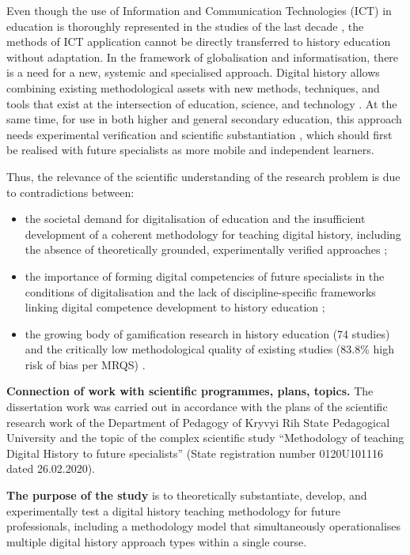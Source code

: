 {Even though the use of Information and Communication Technologies (ICT) in education is thoroughly represented in the studies of the last decade \cite{DichevDicheva2017, KoivistoHamari2019}, the methods of ICT application cannot be directly transferred to history education without adaptation. In the framework of globalisation and informatisation, there is a need for a new, systemic and specialised approach. Digital history allows combining existing methodological assets with new methods, techniques, and tools that exist at the intersection of education, science, and technology \cite{CohenRosenzweig2006, Wright-Maley2018}. At the same time, for use in both higher and general secondary education, this approach needs experimental verification and scientific substantiation \cite{Hattie2009, Tamim2011}, which should first be realised with future specialists as more mobile and independent learners.

Thus, the relevance of the scientific understanding of the research problem is due to contradictions between:
\begin{itemize}
\item the societal demand for digitalisation of education and the insufficient development of a coherent methodology for teaching digital history, including the absence of theoretically grounded, experimentally verified approaches \cite{UNESCO2023, Block2021, Hamari2014, DichevDicheva2017};
\item the importance of forming digital competencies of future specialists in the conditions of digitalisation and the lack of discipline-specific frameworks linking digital competence development to history education \cite{Vuorikari2016, Titova2025cte};
\item the growing body of gamification research in history education (74 studies) and the critically low methodological quality of existing studies (83.8\% high risk of bias per MRQS) \citep{Korniienko2025mrqs}.
\end{itemize}

\textbf{Connection of work with scientific programmes, plans, topics.} The dissertation work was carried out in accordance with the plans of the scientific research work of the Department of Pedagogy of Kryvyi Rih State Pedagogical University and the topic of the complex scientific study ``Methodology of teaching Digital History to future specialists'' (State registration number 0120U101116 dated 26.02.2020).

\textbf{The purpose of the study} is to theoretically substantiate, develop, and experimentally test a digital history teaching methodology for future professionals, including a methodology model that simultaneously operationalises multiple digital history approach types within a single course.

}
